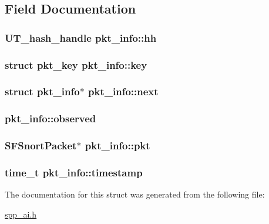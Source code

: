 \subsection{Field Documentation}
\hypertarget{structpkt__info_a264e90d4b5d490de040f38c1072e142f}{
\subsubsection[{hh}]{\setlength{\rightskip}{0pt plus 5cm}UT\_\-hash\_\-handle {\bf pkt\_\-info::hh}}}
\label{structpkt__info_a264e90d4b5d490de040f38c1072e142f}
\hypertarget{structpkt__info_a231d4734d3c62292b06eb9ea4b49c339}{
\subsubsection[{key}]{\setlength{\rightskip}{0pt plus 5cm}struct {\bf pkt\_\-key} {\bf pkt\_\-info::key}}}
\label{structpkt__info_a231d4734d3c62292b06eb9ea4b49c339}
\hypertarget{structpkt__info_a5ee3c51f2ca5768b94819182641ef168}{
\subsubsection[{next}]{\setlength{\rightskip}{0pt plus 5cm}struct {\bf pkt\_\-info}$\ast$ {\bf pkt\_\-info::next}}}
\label{structpkt__info_a5ee3c51f2ca5768b94819182641ef168}
\hypertarget{structpkt__info_ac7ff78ea5faf333fc91f92e3085ea7c9}{
\subsubsection[{observed}]{ {\bf pkt\_\-info::observed}}}
\label{structpkt__info_ac7ff78ea5faf333fc91f92e3085ea7c9}
\hypertarget{structpkt__info_a8d5ebd04a32067b05387e5c5056fe168}{
\subsubsection[{pkt}]{\setlength{\rightskip}{0pt plus 5cm}SFSnortPacket$\ast$ {\bf pkt\_\-info::pkt}}}
\label{structpkt__info_a8d5ebd04a32067b05387e5c5056fe168}
\hypertarget{structpkt__info_a7f5090443f21e6290f0439f1bb872e92}{
\subsubsection[{timestamp}]{\setlength{\rightskip}{0pt plus 5cm}time\_\-t {\bf pkt\_\-info::timestamp}}}
\label{structpkt__info_a7f5090443f21e6290f0439f1bb872e92}


The documentation for this struct was generated from the following file:\begin{DoxyCompactItemize}
\item 
\hyperlink{spp__ai_8h}{spp\_\-ai.h}\end{DoxyCompactItemize}
